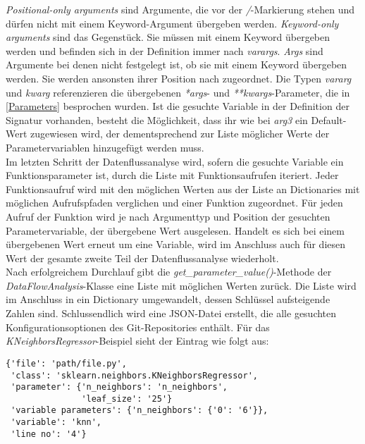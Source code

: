 \documentclass[german,bachelor]{swsLeipzig}
\begin{document}
\textit{Positional-only arguments} sind Argumente, die vor der \textit{/}-Markierung stehen und dürfen nicht mit einem
Keyword-Argument übergeben werden.
\textit{Keyword-only arguments} sind das Gegenstück.
Sie müssen mit einem Keyword übergeben werden und befinden sich in der Definition immer nach \textit{varargs}.
\textit{Args} sind Argumente bei denen nicht festgelegt ist, ob sie mit einem Keyword übergeben werden.
Sie werden ansonsten ihrer Position nach zugeordnet.
Die Typen \textit{vararg} und \textit{kwarg} referenzieren die übergebenen \textit{*args}- und \textit{**kwargs}-Parameter,
die in \ref{Parameters} besprochen wurden.
Ist die gesuchte Variable in der Definition der Signatur vorhanden, besteht die Möglichkeit, dass ihr wie bei \textit{arg3} ein Default-Wert
zugewiesen wird, der dementsprechend zur Liste möglicher Werte der Parametervariablen hinzugefügt werden muss.\\

Im letzten Schritt der Datenflussanalyse wird, sofern die gesuchte Variable ein Funktionsparameter ist,
durch die Liste mit Funktionsaufrufen iteriert.
Jeder Funktionsaufruf wird mit den möglichen Werten aus der Liste an Dictionaries mit möglichen Aufrufspfaden verglichen und
einer Funktion zugeordnet.
Für jeden Aufruf der Funktion wird je nach Argumenttyp und Position der gesuchten Parametervariable, der übergebene
Wert ausgelesen.
Handelt es sich bei einem übergebenen Wert erneut um eine Variable, wird im Anschluss auch für diesen Wert
der gesamte zweite Teil der Datenflussanalyse wiederholt. \\

Nach erfolgreichem Durchlauf gibt die \textit{get\_parameter\_value()}-Methode der \textit{DataFlowAnalysis}-Klasse
eine Liste mit möglichen Werten zurück.
Die Liste wird im Anschluss in ein Dictionary umgewandelt, dessen Schlüssel aufsteigende Zahlen sind.
Schlussendlich wird eine JSON-Datei erstellt, die alle gesuchten Konfigurationsoptionen des Git-Repositories enthält.
Für das \textit{KNeighborsRegressor}-Beispiel sieht der Eintrag wie folgt aus: \\

\begin{lstlisting}[frame=single, basicstyle=\small]
{'file': 'path/file.py',
 'class': 'sklearn.neighbors.KNeighborsRegressor',
 'parameter': {'n_neighbors': 'n_neighbors',
               'leaf_size': '25'}
 'variable parameters': {'n_neighbors': {'0': '6'}},
 'variable': 'knn',
 'line no': '4'}
\end{lstlisting}
\
\end{document}
